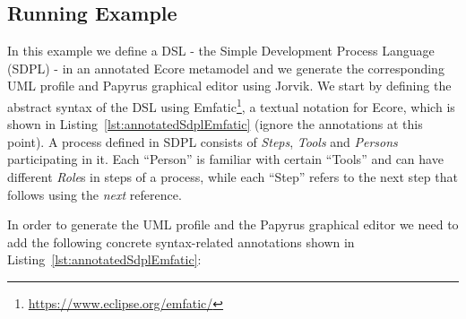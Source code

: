 \subsection{Running Example}
\label{sec:example}
In this example we define a DSL - the Simple Development Process Language (SDPL) - in an annotated Ecore metamodel and we generate the corresponding UML profile and Papyrus graphical editor using Jorvik.
We start by defining the abstract syntax of the DSL using  Emfatic\footnote{\url{https://www.eclipse.org/emfatic/}}, a textual notation for Ecore, which is shown in Listing~\ref{lst:annotatedSdplEmfatic} (ignore the annotations at this point). 
A process defined in SDPL consists of \textit{Steps}, \textit{Tools} and \textit{Persons} participating in it. 
Each ``Person'' is familiar with certain ``Tools'' and can have different \textit{Role}s in steps of a process, while each ``Step'' refers to the next step that follows using the \textit{next} reference.

In order to generate the UML profile and the Papyrus graphical editor we need to add the following concrete syntax-related annotations shown in Listing~\ref{lst:annotatedSdplEmfatic}:

